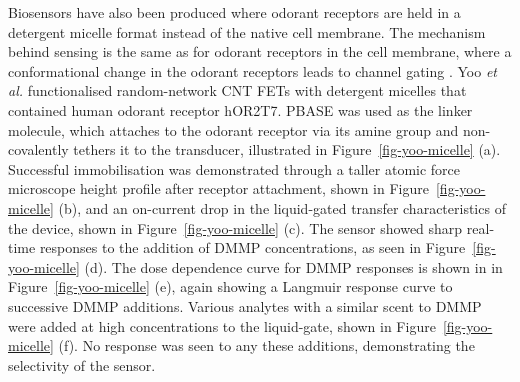 \documentclass[
  a4paper,
]{scrbook}
\begin{document}
Biosensors have also been produced where odorant receptors are held in a
detergent micelle format instead of the native cell membrane. The
mechanism behind sensing is the same as for odorant receptors in the
cell membrane, where a conformational change in the odorant receptors
leads to channel gating \autocite{Dung2018,Yoo2022}. Yoo \emph{et al.}
functionalised random-network CNT FETs with detergent micelles that
contained human odorant receptor hOR2T7. PBASE was used as the linker
molecule, which attaches to the odorant receptor via its amine group and
non-covalently tethers it to the transducer, illustrated in
Figure~\ref{fig-yoo-micelle} (a). Successful immobilisation was
demonstrated through a taller atomic force microscope height profile
after receptor attachment, shown in Figure~\ref{fig-yoo-micelle} (b),
and an on-current drop in the liquid-gated transfer characteristics of
the device, shown in Figure~\ref{fig-yoo-micelle} (c). The sensor showed
sharp real-time responses to the addition of DMMP concentrations, as
seen in Figure~\ref{fig-yoo-micelle} (d). The dose dependence curve for
DMMP responses is shown in in Figure~\ref{fig-yoo-micelle} (e), again
showing a Langmuir response curve to successive DMMP additions. Various
analytes with a similar scent to DMMP were added at high concentrations
to the liquid-gate, shown in Figure~\ref{fig-yoo-micelle} (f). No
response was seen to any these additions, demonstrating the selectivity
of the sensor.
\end{document}

